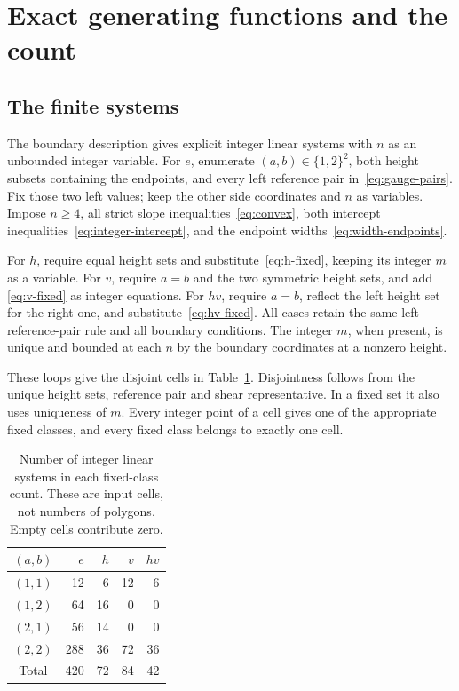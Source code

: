 \documentclass[11pt]{article}
\theoremstyle{remark}
\numberwithin{equation}{section}
\begin{document}
\section{Exact generating functions and the count}\label{sec:series}

\subsection{The finite systems}

The boundary description gives explicit integer linear systems with $n$
as an unbounded integer variable. For $e$, enumerate $(a,b)\in\{1,2\}^2$,
both height subsets containing the endpoints, and every left reference pair
in~\eqref{eq:gauge-pairs}. Fix those two left values; keep the other side
coordinates and $n$ as variables. Impose $n\geq4$, all strict slope
inequalities~\eqref{eq:convex}, both intercept
inequalities~\eqref{eq:integer-intercept}, and the endpoint
widths~\eqref{eq:width-endpoints}.

For $h$, require equal height sets and substitute~\eqref{eq:h-fixed},
keeping its integer $m$ as a variable.
For $v$, require $a=b$ and the two symmetric height sets, and add
\eqref{eq:v-fixed} as integer equations.
For $hv$, require $a=b$, reflect the left height set for the right one,
and substitute~\eqref{eq:hv-fixed}.
All cases retain the same left reference-pair rule and all boundary
conditions. The integer $m$, when present, is unique and bounded at each
$n$ by the boundary coordinates at a nonzero height.

These loops give the disjoint cells in Table~\ref{tab:cells}.
Disjointness follows from the unique height sets, reference pair and
shear representative. In a fixed set it also uses uniqueness of $m$.
Every integer point of a cell gives one of the appropriate fixed classes,
and every fixed class belongs to exactly one cell.

\begin{table}[ht]
\centering
\begin{tabular}{crrrr}
\toprule
$(a,b)$ & $e$ & $h$ & $v$ & $hv$\\
\midrule
$(1,1)$ & 12 & 6 & 12 & 6\\
$(1,2)$ & 64 & 16 & 0 & 0\\
$(2,1)$ & 56 & 14 & 0 & 0\\
$(2,2)$ & 288 & 36 & 72 & 36\\
\midrule
Total & 420 & 72 & 84 & 42\\
\bottomrule
\end{tabular}
\caption{Number of integer linear systems in each fixed-class count.
These are input cells, not numbers of polygons. Empty cells contribute zero.}
\label{tab:cells}
\end{table}
\end{document}
